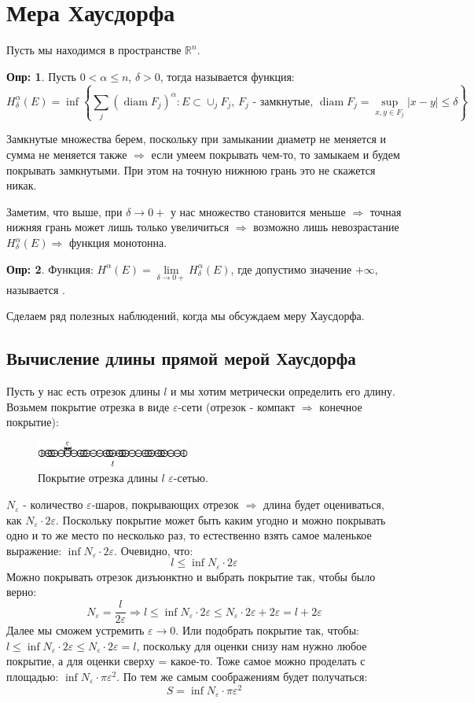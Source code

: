\documentclass[12pt]{article}
\newcommand{\MR}{\mathbb{R}}
\newcommand{\VE}{\varepsilon}
\theoremstyle{definition}
\newtheorem{defn}{Опр:}
\DeclareMathOperator{\diam}{\text{diam}}
\newcommand{\ddsum}[2]{\displaystyle\sum\limits_{#1}^{#2}}
\begin{document}
\section*{Мера Хаусдорфа}
Пусть мы находимся в пространстве $\MR^n$.
\begin{defn}
	Пусть $0 < \alpha \leq n$, $\delta > 0$, тогда  называется функция:
	$$
		H_\delta^\alpha(E) = \inf\left\{\ddsum{j}{}(\diam{F_j})^\alpha \colon E \subset \cup_j F_j, \, F_j \text{ - замкнутые}, \, \diam{F_j} = \sup\limits_{x,y \in F_j} |x - y| \leq \delta \right\}
	$$
\end{defn}
Замкнутые множества берем, поскольку при замыкании диаметр не меняется и сумма не меняется также $\Rightarrow$ если умеем покрывать чем-то, то замыкаем и будем покрывать замкнутыми. При этом на точную нижнюю грань это не скажется никак. 

Заметим, что выше, при $\delta \to 0+$ у нас множество становится меньше $\Rightarrow$ точная нижняя грань может лишь только увеличиться $\Rightarrow$ возможно лишь невозрастание $H_\delta^\alpha(E) \Rightarrow$ функция монотонна.

\begin{defn}
	Функция: $H^\alpha(E) = \lim\limits_{\delta \to 0+} H_\delta^\alpha(E)$, где допустимо значение $+\infty$, называется .
\end{defn}	

Сделаем ряд полезных наблюдений, когда мы обсуждаем меру Хаусдорфа.

\subsection*{Вычисление длины прямой мерой Хаусдорфа}
Пусть у нас есть отрезок длины $l$ и мы хотим метрически определить его длину. Возьмем покрытие отрезка в виде $\VE$-сети (отрезок - компакт $\Rightarrow$ конечное покрытие):
\begin{figure}[H]
	\centering
	\includegraphics[width=0.45\textwidth]{MA4L13_1.eps}
	\caption{Покрытие отрезка длины $l$ $\VE$-сетью.}
	\label{13_1}
\end{figure}
$N_{\VE}$ - количество $\VE$-шаров, покрывающих отрезок $\Rightarrow$ длина будет оцениваться, как $N_{\VE}{\cdot}2\VE$. Поскольку покрытие может быть каким угодно и можно покрывать одно и то же место по несколько раз, то естественно взять самое маленькое выражение: $\inf N_{\VE}{\cdot}2\VE$. Очевидно, что:
$$
	l \leq \inf N_{\VE}{\cdot}2\VE
$$
Можно покрывать отрезок дизъюнктно и выбрать покрытие так, чтобы было верно: 
$$
	N_\VE = \dfrac{l}{2\VE} \Rightarrow l \leq \inf N_{\VE}{\cdot}2\VE \leq N_{\VE}{\cdot}2\VE + 2\VE = l + 2\VE
$$ 
Далее мы сможем устремить $\VE \to 0$. Или подобрать покрытие так, чтобы: $l \leq \inf N_{\VE}{\cdot}2\VE \leq N_{\VE}{\cdot}2\VE = l$, поскольку для оценки снизу нам нужно любое покрытие, а для оценки сверху = какое-то. Тоже самое можно проделать с площадью: $\inf N_\VE {\cdot}\pi \VE^2$. По тем же самым соображениям будет получаться: 
$$
	S = \inf N_\VE {\cdot}\pi \VE^2
$$
\end{document}

